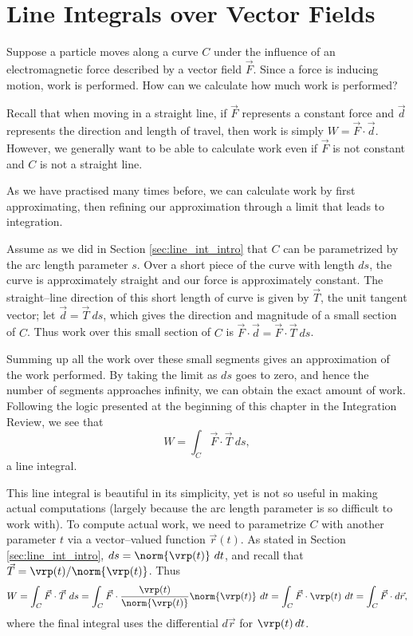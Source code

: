 \section{Line Integrals over Vector Fields}\label{sec:line_int_vf}
Suppose a particle moves along a curve $C$ under the influence of an electromagnetic force described by a vector field $\vec F$. Since a force is inducing motion, work is performed. How can we calculate how much work is performed?

Recall that when moving in a straight line, if $\vec F$ represents a constant force and $\vec d$ represents the direction and length of travel, then work is simply $W = \vec F\cdot \vec d$. However, we generally want to be able to calculate work even if $\vec F$ is not constant and $C$ is not a straight line.

As we have practised many times before, we can calculate work by first approximating, then refining our approximation through a limit that leads to integration. 

Assume as we did in Section \ref{sec:line_int_intro} that $C$ can be parametrized by the arc length parameter $s$. Over a short piece of the curve with length $ds$, the curve is approximately straight and our force is approximately constant. The straight--line direction of this short length of curve is given by $\vec T$, the unit tangent vector;   let $\vec d = \vec T\ ds$, which gives  the direction and magnitude of a small section of $C$. Thus work over this small section of $C$ is $\vec F \cdot \vec d = \vec F\cdot \vec T\ ds$. 

Summing up all the work over these small segments gives an approximation of the work performed. By taking the limit as $ds$ goes to zero, and hence the number of segments approaches infinity, we can obtain the exact amount of work. Following the logic presented at the beginning of this chapter in the Integration Review, we see that 
\[
W = \int_C \vec F\cdot \vec T\ ds,
\]
a line integral.

This line integral is beautiful in its simplicity, yet is not so useful in making actual computations (largely because the arc length parameter is so difficult to work with). To compute actual work, we need to parametrize $C$ with another parameter  $t$ via a vector--valued function $\vec r(t)$. As stated in Section \ref{sec:line_int_intro}, $ds = \norm{\vrp(t)}\ dt$, and recall that $\vec T = \vrp(t)/\norm{\vrp(t)}$. Thus
\begin{equation}
W = \int_C \vec F\cdot\vec T\ ds = \int_C \vec F\cdot \frac{\vrp(t)}{\norm{\vrp(t)}}\norm{\vrp(t)}\ dt = \int_C\vec F\cdot \vrp(t)\ dt = \int_C \vec F\cdot d\vec r,
\label{eq:line_integral}\end{equation}
where the final integral uses the differential $d\vec r$ for $\vrp(t)\,dt$.


